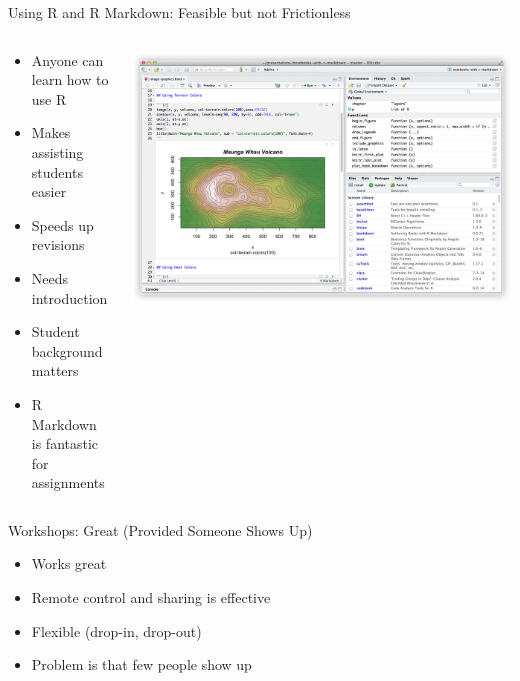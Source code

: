 \begin{frame}{Using R and R Markdown: Feasible but not Frictionless}
  \begin{columns}[c,onlytextwidth]
    \begin{column}{0.5\linewidth}

      \begin{itemize}
        \item Anyone can learn how to use R
        \item Makes assisting students easier
        \item Speeds up revisions
        \item Needs introduction
        \item Student background matters
        \item R Markdown is fantastic for assignments
      \end{itemize}
    \end{column}
    \begin{column}{0.45\linewidth}
      \includegraphics[width=\linewidth]{figures/rmarkdown.png}
    \end{column}
  \end{columns}
\end{frame}

\begin{frame}{Workshops: Great (Provided Someone Shows Up)}
  \begin{itemize}
    \item Works great
    \item Remote control and sharing is effective
    \item Flexible (drop-in, drop-out)
    \item Problem is that few people show up
  \end{itemize}
\end{frame}

